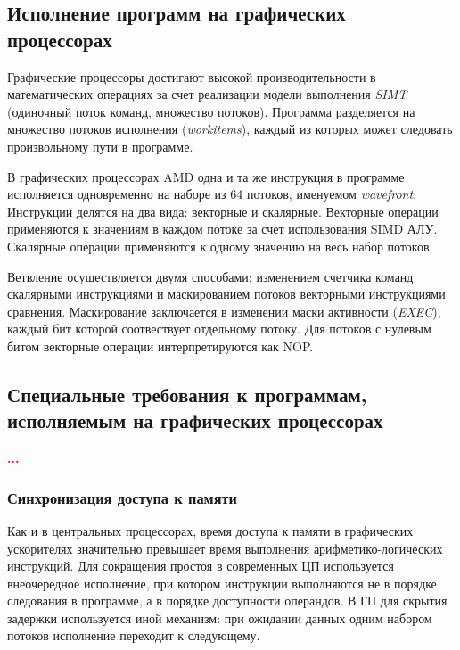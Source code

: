 \documentclass[a4paper,14pt]{extarticle}
\newcommand{\todo}[1]{\textbf{\textcolor{red}{#1}}}
\begin{document}
\subsection{Исполнение программ на графических процессорах}

Графические процессоры достигают высокой производительности в математических операциях
за счет реализации модели выполнения \textit{SIMT} (одиночный поток команд, множество потоков).
Программа разделяется на множество потоков исполнения (\textit{workitems}),
каждый из которых может следовать произвольному пути в программе.

В графических процессорах AMD одна и та же инструкция в программе исполняется одновременно
на наборе из 64 потоков, именуемом \textit{wavefront}. Инструкции делятся на два вида:
векторные и скалярные. Векторные операции применяются к значениям в каждом потоке
за счет использования SIMD АЛУ. Скалярные операции применяются к одному значению на весь набор
потоков.

Ветвление осуществляется двумя способами: изменением счетчика команд скалярными инструкциями
и маскированием потоков векторными инструкциями сравнения. Маскирование заключается в изменении
маски активности (\textit{EXEC}), каждый бит которой соотвествует отдельному потоку.
Для потоков с нулевым битом векторные операции интерпретируются как NOP.

\subsection{Специальные требования к программам, исполняемым на графических процессорах}

\todo{...}

\subsubsection{Синхронизация доступа к памяти}

Как и в центральных процессорах, время доступа к памяти в графических ускорителях
значительно превышает время выполнения арифметико-логических инструкций.
Для сокращения простоя в современных ЦП используется внеочередное исполнение, при котором
инструкции выполняются не в порядке следования в программе, а в порядке доступности операндов.
В ГП для скрытия задержки используется иной механизм: при ожидании данных одним набором
потоков исполнение переходит к следующему.
\end{document}
